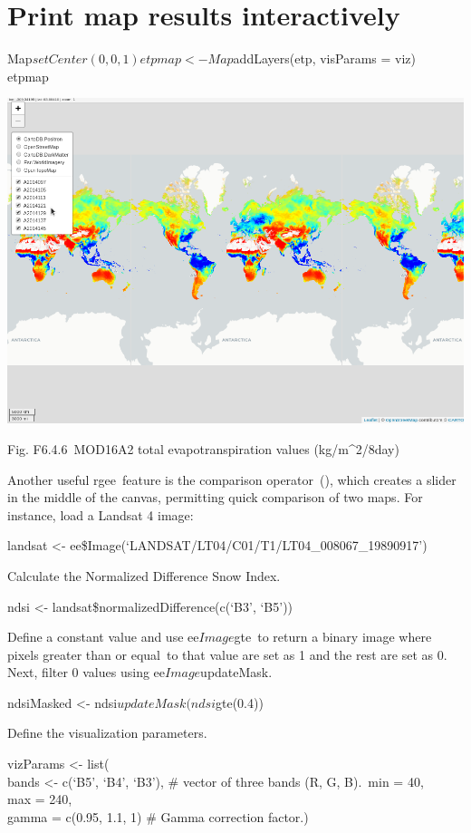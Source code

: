 \documentclass[
  letterpaper,
  DIV=11,
  numbers=noendperiod]{scrreprt}
\begin{document}
\hypertarget{print-map-results-interactively}{%
\chapter{Print map results
interactively}\label{print-map-results-interactively}}

Map\(setCenter(0, 0, 1) etpmap <- Map\)addLayers(etp, visParams = viz)\\
etpmap

\includegraphics{./F6/image21.png}

Fig. F6.4.6~MOD16A2 total evapotranspiration values (kg/m\^{}2/8day)

Another useful rgee~feature is the comparison operator~(\textbar), which
creates a slider in the middle of the canvas, permitting quick
comparison of two maps. For instance, load a Landsat 4 image:

landsat \textless-
ee\$Image(`LANDSAT/LT04/C01/T1/LT04\_008067\_19890917')

Calculate the Normalized Difference Snow Index.

ndsi \textless- landsat\$normalizedDifference(c(`B3', `B5'))

Define a constant value and use ee\(Image\)gte~to return a binary image
where pixels greater than or equal~to that value are set as 1 and the
rest are set as 0. Next, filter 0 values using ee\(Image\)updateMask.

ndsiMasked \textless- ndsi\(updateMask(ndsi\)gte(0.4))

Define the visualization parameters.

vizParams \textless- list(\\
\hspace*{0.333em}bands \textless- c(`B5', `B4', `B3'), \# vector of
three bands (R, G, B).~min = 40,\\
\hspace*{0.333em}max = 240,\\
\hspace*{0.333em}gamma = c(0.95, 1.1, 1) \# Gamma correction factor.)
\end{document}
